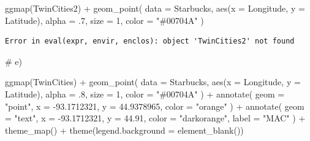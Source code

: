 \documentclass[
  letterpaper,
  DIV=11,
  numbers=noendperiod]{scrreprt}
\newenvironment{Shaded}{\begin{snugshade}}{\end{snugshade}}
\newcommand{\AttributeTok}[1]{\textcolor[rgb]{0.40,0.45,0.13}{#1}}
\newcommand{\CommentTok}[1]{\textcolor[rgb]{0.37,0.37,0.37}{#1}}
\newcommand{\DecValTok}[1]{\textcolor[rgb]{0.68,0.00,0.00}{#1}}
\newcommand{\FloatTok}[1]{\textcolor[rgb]{0.68,0.00,0.00}{#1}}
\newcommand{\FunctionTok}[1]{\textcolor[rgb]{0.28,0.35,0.67}{#1}}
\newcommand{\NormalTok}[1]{\textcolor[rgb]{0.00,0.23,0.31}{#1}}
\newcommand{\SpecialCharTok}[1]{\textcolor[rgb]{0.37,0.37,0.37}{#1}}
\newcommand{\StringTok}[1]{\textcolor[rgb]{0.13,0.47,0.30}{#1}}
\begin{document}
\begin{Shaded}
\begin{Highlighting}[]
\FunctionTok{ggmap}\NormalTok{(TwinCities2) }\SpecialCharTok{+}
  \FunctionTok{geom\_point}\NormalTok{(}
    \AttributeTok{data =}\NormalTok{ Starbucks,}
    \FunctionTok{aes}\NormalTok{(}\AttributeTok{x =}\NormalTok{ Longitude, }\AttributeTok{y =}\NormalTok{ Latitude),}
    \AttributeTok{alpha =}\NormalTok{ .}\DecValTok{7}\NormalTok{, }\AttributeTok{size =} \DecValTok{1}\NormalTok{,}
    \AttributeTok{color =} \StringTok{"\#00704A"}
\NormalTok{  )}
\end{Highlighting}
\end{Shaded}

\begin{verbatim}
Error in eval(expr, envir, enclos): object 'TwinCities2' not found
\end{verbatim}

\begin{Shaded}
\begin{Highlighting}[]
\CommentTok{\# e)}

\FunctionTok{ggmap}\NormalTok{(TwinCities) }\SpecialCharTok{+}
  \FunctionTok{geom\_point}\NormalTok{(}
    \AttributeTok{data =}\NormalTok{ Starbucks,}
    \FunctionTok{aes}\NormalTok{(}\AttributeTok{x =}\NormalTok{ Longitude, }\AttributeTok{y =}\NormalTok{ Latitude),}
    \AttributeTok{alpha =}\NormalTok{ .}\DecValTok{8}\NormalTok{, }\AttributeTok{size =} \DecValTok{1}\NormalTok{,}
    \AttributeTok{color =} \StringTok{"\#00704A"}
\NormalTok{  ) }\SpecialCharTok{+}
  \FunctionTok{annotate}\NormalTok{(}
    \AttributeTok{geom =} \StringTok{"point"}\NormalTok{,}
    \AttributeTok{x =} \SpecialCharTok{{-}}\FloatTok{93.1712321}\NormalTok{,}
    \AttributeTok{y =} \FloatTok{44.9378965}\NormalTok{,}
    \AttributeTok{color =} \StringTok{"orange"}
\NormalTok{  ) }\SpecialCharTok{+}
  \FunctionTok{annotate}\NormalTok{(}
    \AttributeTok{geom =} \StringTok{"text"}\NormalTok{,}
    \AttributeTok{x =} \SpecialCharTok{{-}}\FloatTok{93.1712321}\NormalTok{,}
    \AttributeTok{y =} \FloatTok{44.91}\NormalTok{,}
    \AttributeTok{color =} \StringTok{"darkorange"}\NormalTok{,}
    \AttributeTok{label =} \StringTok{"MAC"}
\NormalTok{  ) }\SpecialCharTok{+}
  \FunctionTok{theme\_map}\NormalTok{() }\SpecialCharTok{+}
  \FunctionTok{theme}\NormalTok{(}\AttributeTok{legend.background =} \FunctionTok{element\_blank}\NormalTok{())}
\end{Highlighting}
\end{Shaded}
\end{document}
